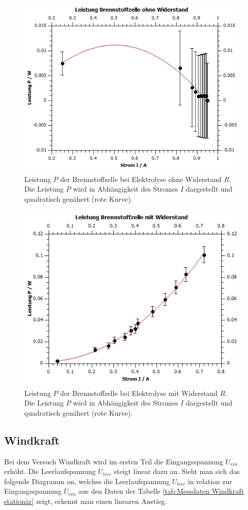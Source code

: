 \documentclass[12pt,a4paper,twoside]{article}
\begin{document}
\begin{figure}[H]
    \centering
    \includegraphics[width=0.6\linewidth]{nudes/brennstoff leistung ohne r.jpg}
    \caption{Leistung $P$ der Brennstoffzelle bei Elektrolyse ohne Widerstand $R$. Die Leistung $P$ wird in Abhängigkeit des Stromes $I$ dargestellt und quadratisch genähert (rote Kurve).}
    \label{fig:diagramm Leistung ohne R}
\end{figure}

\begin{figure}[H]
    \centering
    \includegraphics[width=0.6\linewidth]{nudes/brennstoff leistung mit r.jpg}
    \caption{Leistung $P$ der Brennstoffzelle bei Elektrolyse mit Widerstand $R$. Die Leistung $P$ wird in Abhängigkeit des Stromes $I$ dargestellt und quadratisch genähert (rote Kurve).}
    \label{fig:diagramm Leistung mit R}
\end{figure}

\subsection{Windkraft}
Bei dem Versuch Windkraft wird im ersten Teil die Eingangsspannung $U_{ein}$ erhöht. Die Leerlaufspannung $U_{leer}$ steigt linear dazu an. Sieht man sich das folgende Diagramm an, welches die Leerlaufspannung $U_{leer}$ in relation zur Eingangsspannung $U_{ein}$ aus den Daten der Tabelle \ref{tab:Messdaten Windkraft stationär} zeigt, 
erkennt man einen linearen Anstieg. 
\end{document}
